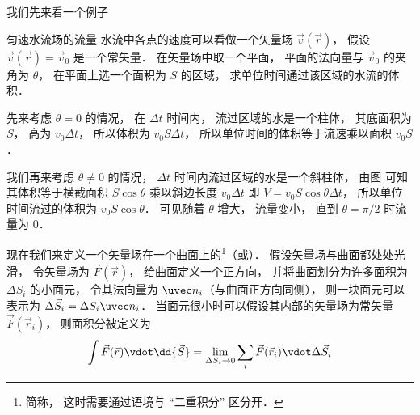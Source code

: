 

我们先来看一个例子
\begin{exam}{匀速水流场的流量}
水流中各点的速度可以看做一个矢量场 $\vec v(\vec r)$， 假设 $\vec v(\vec r) = \vec v_0$ 是一个常矢量． 在矢量场中取一个平面， 平面的法向量与 $\vec v_0$ 的夹角为 $\theta$， 在平面上选一个面积为 $S$ 的区域， 求单位时间通过该区域的水流的体积．

先来考虑 $\theta = 0$ 的情况， 在 $\Delta t$ 时间内， 流过区域的水是一个柱体， 其底面积为 $S$， 高为 $v_0\Delta t$， 所以体积为 $v_0 S\Delta t$， 所以单位时间的体积等于流速乘以面积 $v_0 S$．

我们再来考虑 $\theta \ne 0$ 的情况， $\Delta t$ 时间内流过区域的水是一个斜柱体， 由图%
可知其体积等于横截面积 $S\cos\theta$ 乘以斜边长度 $v_0\Delta t$ 即 $V = v_0 S\cos\theta\Delta t$， 所以单位时间流过的体积为 $v_0 S\cos\theta$． 可见随着 $\theta$ 增大， 流量变小， 直到 $\theta = \pi/2$ 时流量为 $0$．
\end{exam}

现在我们来定义一个矢量场在一个曲面上的\footnote{简称， 这时需要通过语境与 “二重积分” 区分开．}（或）． 假设矢量场与曲面都处处光滑， 令矢量场为 $\vec F(\vec r)$， 给曲面定义一个正方向， 并将曲面划分为许多面积为 $\Delta S_i$ 的小面元， 令其法向量为 $\uvec n_i$（与曲面正方向同侧）， 则一块面元可以表示为 $\Delta \vec S_i = \Delta S_i \uvec n_i$． 当面元很小时可以假设其内部的矢量场为常矢量 $\vec F(\vec r_i)$， 则面积分被定义为
\begin{equation}
\int \vec F(\vec r) \vdot \dd{\vec S} = \lim_{\Delta S_i\to 0} \sum_i \vec F(\vec r_i) \vdot \Delta \vec S_i
\end{equation}